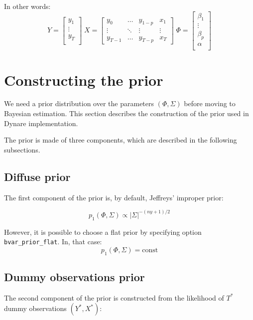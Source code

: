 \documentclass[10pt,a4paper]{article}
\begin{document}
In other words:
$$Y = \left[
\begin{array}{c}
y_1 \\
\vdots \\
y_T \\
\end{array}
\right]
\; X = \left[
\begin{array}{cccc}
y_0 & \ldots & y_{1-p} & x_1 \\
\vdots & \ddots & \vdots & \vdots \\
y_{T-1} & \ldots & y_{T-p} & x_T
\end{array}
\right]
\; \Phi = \left[
\begin{array}{c}
\beta_1 \\
\vdots \\
\beta_p \\
\alpha \\
\end{array}
\right]$$

\section{Constructing the prior}
\label{sec-prior}

We need a prior distribution over the parameters $(\Phi, \Sigma)$ before moving to Bayesian estimation. This section describes the construction of the prior used in Dynare implementation.

The prior is made of three components, which are described in the following subsections.

\subsection{Diffuse prior}

The first component of the prior is, by default, Jeffreys' improper prior:

$$p_1(\Phi,\Sigma) \propto |\Sigma|^{-(ny+1)/2}$$

However, it is possible to choose a flat prior by specifying option \texttt{bvar\_prior\_flat}. In, that case:
$$p_1(\Phi, \Sigma) = \text{const}$$

\subsection{Dummy observations prior}

The second component of the prior is constructed from the likelihood of $T^*$ dummy observations $(Y^*,X^*)$:
\end{document}
